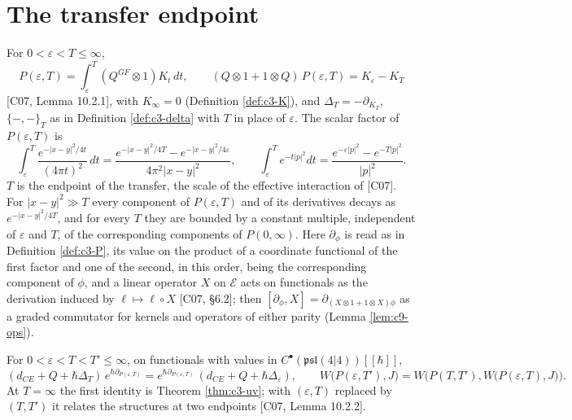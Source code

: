 \section{The transfer endpoint}

\begin{definition}
\label{def:c8-PT}
For $0<\varepsilon<T\le\infty$,
\begin{equation}
P(\varepsilon,T)=\int_\varepsilon^T(Q^{GF}\otimes1)K_t\,dt,\qquad (Q\otimes1+1\otimes Q)\,P(\varepsilon,T)=K_\varepsilon-K_T
\label{eq:c8-PT}
\end{equation}
[C07, Lemma 10.2.1], with $K_\infty=0$ (Definition \ref{def:c3-K}), and $\Delta_T=-\partial_{K_T}$, $\{-,-\}_T$ as in Definition \ref{def:c3-delta} with $T$ in place of $\varepsilon$. The scalar factor of $P(\varepsilon,T)$ is
\[
\int_\varepsilon^T\frac{e^{-|x-y|^2/4t}}{(4\pi t)^2}\,dt=\frac{e^{-|x-y|^2/4T}-e^{-|x-y|^2/4\varepsilon}}{4\pi^2|x-y|^2},\qquad \int_\varepsilon^Te^{-t|p|^2}dt=\frac{e^{-\varepsilon|p|^2}-e^{-T|p|^2}}{|p|^2}.
\]
$T$ is the endpoint of the transfer, the scale of the effective interaction of [C07]. For $|x-y|^2\gg T$ every component of $P(\varepsilon,T)$ and of its derivatives decays as $e^{-|x-y|^2/4T}$, and for every $T$ they are bounded by a constant multiple, independent of $\varepsilon$ and $T$, of the corresponding components of $P(0,\infty)$. Here $\partial_\phi$ is read as in Definition \ref{def:c3-P}, its value on the product of a coordinate functional of the first factor and one of the second, in this order, being the corresponding component of $\phi$, and a linear operator $X$ on $\mathscr E$ acts on functionals as the derivation induced by $\ell\mapsto\ell\circ X$ [C07, §6.2]; then $[\partial_\phi,X]=\partial_{(X\otimes1+1\otimes X)\phi}$ as a graded commutator for kernels and operators of either parity (Lemma \ref{lem:c9-ops}).
\end{definition}

\begin{lemma}
\label{lem:c8-transfer}
For $0<\varepsilon<T<T'\le\infty$, on functionals with values in $C^\bullet(\mathfrak{psl}(4|4))[[\hbar]]$,
\begin{equation}
(d_{CE}+Q+\hbar\Delta_T)\,e^{\hbar\partial_{P(\varepsilon,T)}}=e^{\hbar\partial_{P(\varepsilon,T)}}\,(d_{CE}+Q+\hbar\Delta_\varepsilon),\qquad W\big(P(\varepsilon,T'),J\big)=W\Big(P(T,T'),W\big(P(\varepsilon,T),J\big)\Big).
\label{eq:c8-transfer}
\end{equation}
At $T=\infty$ the first identity is Theorem \ref{thm:c3-uv}; with $(\varepsilon,T)$ replaced by $(T,T')$ it relates the structures at two endpoints [C07, Lemma 10.2.2].
\end{lemma}


